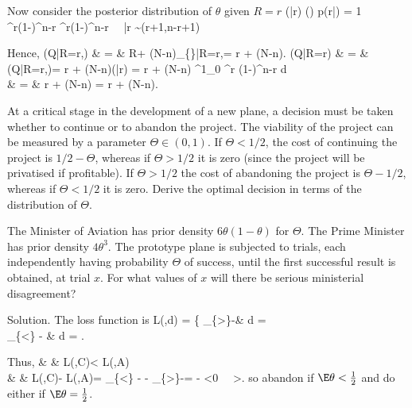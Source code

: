 Now consider the posterior distribution of $\theta$ given $R=r$
\be
\pi(\theta|r) \propto \pi(\theta) p(r|\theta) = 1\cdot {} \theta^r(1-\theta)^{n-r} \propto \theta^r(1-\theta)^{n-r} \ \ra \ \theta|r \sim {}(r+1,n-r+1)
\ee

Hence,
\beast
\E(Q|R=r,\theta) & = & \E\lob R+ (N-n)_{\{\}}|R=r,\theta\rob = r + (N-n)\theta.
\eeast
\beast
\E(Q|R=r) & = & \E\lob \E(Q|R=r,\theta)\rob = r + (N-n)\E(\theta|r) = r + (N-n) \int^1_0 \theta \theta^r (1-\theta)^{n-r} d\theta\\
& = & r + (N-n)  = r + (N-n).
\eeast





\item At a critical stage in the development of a new plane, a decision must be taken whether to continue or to abandon the project. The viability of the project can be measured by a parameter $\Theta \in (0, 1)$. If $\Theta < 1/2$, the cost of continuing the project is $1/2 - \Theta$, whereas if $\Theta > 1/2$ it is zero (since the project will be privatised if profitable). If $\Theta > 1/2$ the cost of abandoning the project is $\Theta - 1/2$, whereas if $\Theta < 1/2$ it is zero. Derive the optimal decision in terms of the distribution of $\Theta$.

The Minister of Aviation has prior density $6\theta(1 - \theta)$ for $\Theta$. The Prime Minister has prior density $4\theta^3$. The prototype plane is subjected to trials, each independently having probability $\Theta$ of success, until the first successful result is obtained, at trial $x$. For what values of $x$ will there be serious ministerial disagreement?



Solution. The loss function is
\be
L(\theta,d) = \left\{
_{\{\theta>\}}\lob \theta-\rob \quad\quad & d =  \\
_{\{\theta<\}}\lob {} - \theta \rob \quad\quad & d = 
\ea\right.
\ee

Thus,
\beast
{} & \lra & \E\lob L(\theta,C)\rob <  \E\lob L(\theta,A)\rob\\
& \lra & \E\lob L(\theta,C)- L(\theta,A)\rob = \E\lob {}_{\{\theta<\}}\lob {} - \theta \rob - _{\{\theta>\}}\lob \theta-\rob\rob = \E\lob {} - \theta \rob <0 \ \lra \ \E\theta >.
\eeast
so abandon if $\E\theta <\frac 12$ and do either if $\E \theta = \frac 12$.

